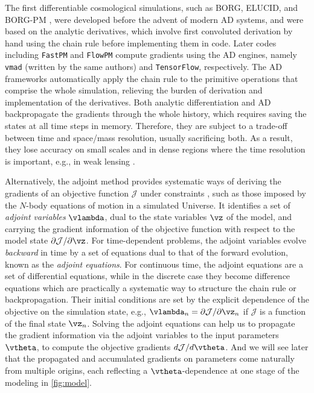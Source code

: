 \documentclass[modern, dvipsnames]{aastex631}
\renewcommand{\d}{d}
\newcommand{\p}{\partial}
\newcommand{\cJ}{\mathcal{J}}
\begin{document}
The first differentiable cosmological simulations, such as BORG, ELUCID,
and BORG-PM \citep{BORG, ELUCID, BORG-PM}, were developed before the
advent of modern AD systems, and were based on the analytic derivatives,
which involve first convoluted derivation by hand using the chain rule
\citep[see e.g.,][App.~D]{SeljakEtAl2017} before implementing them in
code.
Later codes including \texttt{FastPM} and \texttt{FlowPM} \citep{FastPM,
vmad, SeljakEtAl2017, FlowPM} compute gradients using the AD engines,
namely \texttt{vmad} (written by the same authors) and
\texttt{TensorFlow}, respectively.
The AD frameworks automatically apply the chain rule to the primitive
operations that comprise the whole simulation, relieving the burden of
derivation and implementation of the derivatives.
Both analytic differentiation and AD backpropagate the gradients through
the whole history, which requires saving the states at all time steps in
memory.
Therefore, they are subject to a trade-off between time and space/mass
resolution, usually sacrificing both.
As a result, they lose accuracy on small scales and in dense regions
where the time resolution is important, e.g., in weak lensing
\citep{MADLens}.

Alternatively, the adjoint method provides systematic ways of deriving
the gradients of an objective function $\cJ$ under constraints
\citep{Pontryagin1962}, such as those imposed by the $N$-body equations
of motion in a simulated Universe.
It identifies a set of \emph{adjoint variables} $\vlambda$, dual to the
state variables $\vz$ of the model, and carrying the gradient
information of the objective function with respect to the model state
$\p\cJ / \p\vz$.
For time-dependent problems, the adjoint variables evolve
\emph{backward} in time by a set of equations dual to that of the
forward evolution, known as the \emph{adjoint equations}.
For continuous time, the adjoint equations are a set of differential
equations, while in the discrete case they become difference equations
which are practically a systematic way to structure the chain rule or
backpropagation.
Their initial conditions are set by the explicit dependence of the
objective on the simulation state, e.g., $\vlambda_n = \p\cJ / \p\vz_n$
if $\cJ$ is a function of the final state $\vz_n$.
Solving the adjoint equations can help us to propagate the gradient
information via the adjoint variables to the input parameters $\vtheta$,
to compute the objective gradients $\d\cJ / \d\vtheta$.
And we will see later that the propagated and accumulated gradients on
parameters come naturally from multiple origins, each reflecting a
$\vtheta$-dependence at one stage of the modeling in
\autoref{fig:model}.
\end{document}
